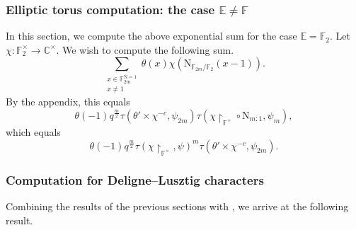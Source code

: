 \documentclass[12pt, reqno]{amsart}
\theoremstyle{definition}
\theoremstyle{definition}
\theoremstyle{definition}
\newcommand{\cComplex}{\mathbb{C}}
\newcommand{\multiplicativegroup}[1]{#1^{\times}}
\newcommand{\fieldCharacter}{\psi}
\newcommand{\minusInvolution}[1]{#1^{-c}}
\newcommand{\FieldNorm}[2]{\mathrm{N}_{#1:#2}}
\newcommand{\aFieldNorm}{\mathrm{N}}
\newcommand{\finiteField}{\mathbb{F}}
\newcommand{\quadraticExtension}{\mathbb{E}}
\newcommand{\finiteFieldExtension}[1]{\finiteField_{#1}}
\newcommand{\NormOneGroup}[1]{\finiteFieldExtension{#1}^{\aFieldNorm = 1}}
\newcommand{\GaussSumCharacter}[3]{\tau\left(#1 \times #2, #3\right)}
\begin{document}
\subsubsection{Elliptic torus computation: the case $\quadraticExtension \ne \finiteField$}
In this section, we compute the above exponential sum for the case $\quadraticExtension = \finiteFieldExtension{2}$. Let $\chi \colon \multiplicativegroup{\finiteFieldExtension{2}} \to \multiplicativegroup{\cComplex}$. We wish to compute the following sum.
$$\sum_{\substack{x \in \NormOneGroup{2m}\\
		x \ne 1}} \theta \left(x\right) \chi\left(\aFieldNorm_{\finiteFieldExtension{2m} \slash \finiteFieldExtension{2}}\left(x - 1\right)\right).$$
By the appendix, this equals
$$\theta\left(-1\right) q^{\frac{m}{2}} \GaussSumCharacter{\theta'}{\minusInvolution{\chi}}{\fieldCharacter_{2m}} \tau\left(\chi \restriction_{\multiplicativegroup{\finiteField}} \circ \FieldNorm{m}{1}, \fieldCharacter_m\right),$$
which equals
$$\theta\left(-1\right) q^{\frac{m}{2}} \tau\left(\chi \restriction_{\multiplicativegroup{\finiteField}}, \fieldCharacter\right)^m \GaussSumCharacter{\theta'}{\minusInvolution{\chi}}{\fieldCharacter_{2m}}.$$

\subsubsection{Computation for Deligne--Lusztig characters}
Combining the results of the previous sections with , we arrive at the following result.
\end{document}
